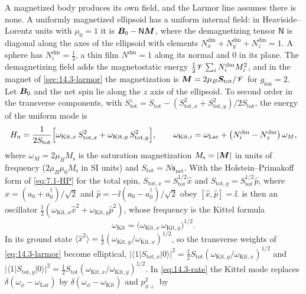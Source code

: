 A magnetized body produces its own field, and the Larmor line assumes there is none. A uniformly magnetized ellipsoid has a uniform internal field: in Heaviside--Lorentz units with $\mu_0 = 1$ it is $\bm{B}_0 - \mathsf{N}\bm{M}$, where the demagnetizing tensor $\mathsf{N}$ is diagonal along the axes of the ellipsoid with elements $N^{\mathrm{dm}}_x + N^{\mathrm{dm}}_y + N^{\mathrm{dm}}_z = 1$. A sphere has $N^{\mathrm{dm}}_i = \frac13$, a thin film $N^{\mathrm{dm}} = 1$ along its normal and 0 in its plane. The demagnetizing field adds the magnetostatic energy $\frac12\mathscr{V}\sum_iN^{\mathrm{dm}}_iM_i^2$, and in the magnet of \cref{sec:14.3-larmor} the magnetization is $\bm{M} = 2\mu_B\bm{S}_{\mathrm{tot}}/\mathscr{V}$ for $g_{\mathrm{ion}} = 2$. Let $\bm{B}_0$ and the net spin lie along the $z$ axis of the ellipsoid. To second order in the transverse components, with $S^z_{\mathrm{tot}} = S_{\mathrm{tot}} - (S_{\mathrm{tot},x}^2 + S_{\mathrm{tot},y}^2)/2S_{\mathrm{tot}}$, the energy of the uniform mode is
\begin{equation}
  H_{\mathrm{u}} = \frac{1}{2S_{\mathrm{tot}}}\Bigl[\omega_{\mathrm{Kit},x}\,S_{\mathrm{tot},x}^2 + \omega_{\mathrm{Kit},y}\,S_{\mathrm{tot},y}^2\Bigr], \qquad
  \omega_{\mathrm{Kit},i} = \omega_{\mathrm{Lar}} + \bigl(N^{\mathrm{dm}}_i - N^{\mathrm{dm}}_z\bigr)\,\omega_M ,
  \label{eq:14.3-Hu}
\end{equation}
where $\omega_M = 2\mu_BM_{\mathrm{s}}$ is the saturation magnetization $M_{\mathrm{s}} = |\bm{M}|$ in units of frequency ($2\mu_B\mu_0M_{\mathrm{s}}$ in SI units) and $S_{\mathrm{tot}} = N\mathfrak{s}_{\mathrm{net}}$. With the Holstein--Primakoff form of \cref{eq:7.1-HP} for the total spin, $S_{\mathrm{tot},x} = S_{\mathrm{tot}}^{1/2}\hat x$ and $S_{\mathrm{tot},y} = S_{\mathrm{tot}}^{1/2}\hat p$, where $\hat x = (a_0 + a_0^\dagger)/\sqrt2$ and $\hat p = -\ii(a_0 - a_0^\dagger)/\sqrt2$ obey $[\hat x, \hat p] = \ii$.  is then an oscillator $\frac12(\omega_{\mathrm{Kit},x}\hat x^2 + \omega_{\mathrm{Kit},y}\hat p^2)$, whose frequency is the Kittel formula~\cite{kittel1948theory}
\begin{equation}
  \omega_{\mathrm{Kit}} = \bigl(\omega_{\mathrm{Kit},x}\,\omega_{\mathrm{Kit},y}\bigr)^{1/2} .
  \label{eq:14.3-kittel}
\end{equation}
In its ground state $\langle\hat x^2\rangle = \frac12(\omega_{\mathrm{Kit},y}/\omega_{\mathrm{Kit},x})^{1/2}$, so the transverse weights of \cref{eq:14.3-larmor} become elliptical, $|\langle1|S_{\mathrm{tot},x}|0\rangle|^2 = \frac12S_{\mathrm{tot}}(\omega_{\mathrm{Kit},y}/\omega_{\mathrm{Kit},x})^{1/2}$ and $|\langle1|S_{\mathrm{tot},y}|0\rangle|^2 = \frac12S_{\mathrm{tot}}(\omega_{\mathrm{Kit},x}/\omega_{\mathrm{Kit},y})^{1/2}$. In \cref{eq:14.3-rate} the Kittel mode replaces $\delta(\omega_\phi - \omega_{\mathrm{Lar}})$ by $\delta(\omega_\phi - \omega_{\mathrm{Kit}})$ and $p_{\phi\perp}^2$ by
